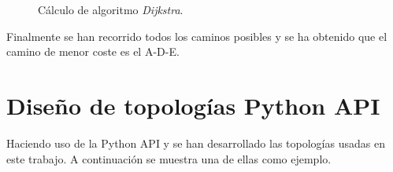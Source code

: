 \documentclass[a4paper,11pt]{book}
\begin{document}
\begin{figure}[tb]
\centering
{}
\hspace{0.5cm}
\caption{Cálculo de algoritmo \textit{Dijkstra}.}
\end{figure}

Finalmente se han recorrido todos los caminos posibles y se ha obtenido que el camino de menor coste es el A-D-E.

\newpage
\section{Diseño de topologías Python \ac{API}}
Haciendo uso de la Python \ac{API} y \cite{mininetAPI} se han desarrollado las topologías usadas en este trabajo. A continuación se muestra una de ellas como ejemplo.
\end{document}
